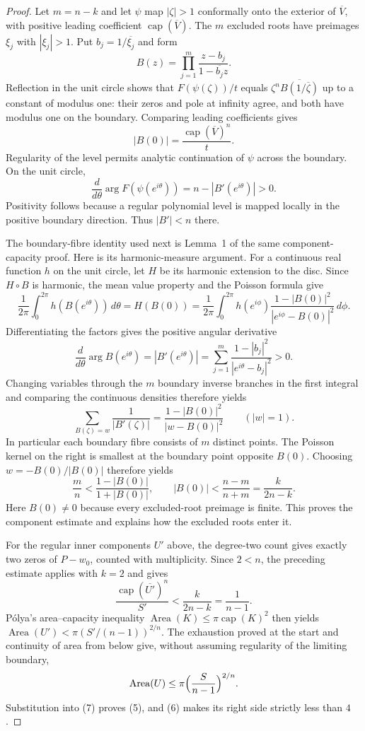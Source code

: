 \documentclass[11pt]{article}
\begin{document}
\begin{proof}
Let $m=n-k$ and let $\psi$ map $|\zeta|>1$ conformally onto the
exterior of $\overline V$, with positive leading coefficient
$\operatorname{cap}(\overline V)$. The $m$ excluded roots have preimages
$\xi_j$ with $|\xi_j|>1$. Put $b_j=1/\overline{\xi_j}$ and form
\[
 B(z)=\prod_{j=1}^m\frac{z-b_j}{1-\overline{b_j}z}.
\]
Reflection in the unit circle shows that $F(\psi(\zeta))/t$ equals
$\zeta^n\overline{B(1/\overline\zeta)}$ up to a constant of modulus one:
their zeros and pole at infinity agree, and both have modulus one on
the boundary. Comparing leading coefficients gives
\[
 |B(0)|=\frac{\operatorname{cap}(\overline V)^n}{t}.
\]
Regularity of the level permits analytic continuation of $\psi$ across
the boundary. On the unit circle,
\[
 \frac{d}{d\theta}\arg F(\psi(e^{i\theta}))
 =n-|B'(e^{i\theta})|>0.
\]
Positivity follows because a regular polynomial level is mapped locally
in the positive boundary direction. Thus $|B'|<n$ there.

The boundary-fibre identity used next is Lemma~1 of the same
component-capacity proof. Here is its harmonic-measure argument.
For a continuous real function $h$ on the unit circle, let $H$ be its
harmonic extension to the disc. Since $H\circ B$ is harmonic, the mean
value property and the Poisson formula give
\[
 \frac1{2\pi}\int_0^{2\pi}h(B(e^{i\theta}))\,d\theta
 =H(B(0))
 =\frac1{2\pi}\int_0^{2\pi}h(e^{i\phi})
   \frac{1-|B(0)|^2}{|e^{i\phi}-B(0)|^2}\,d\phi.
\]
Differentiating the factors gives the positive angular derivative
\[
 \frac{d}{d\theta}\arg B(e^{i\theta})
 =|B'(e^{i\theta})|
 =\sum_{j=1}^m\frac{1-|b_j|^2}{|e^{i\theta}-b_j|^2}>0.
\]
Changing variables through the $m$ boundary inverse branches in the
first integral and comparing the continuous densities therefore yields
\[
 \sum_{B(\zeta)=w}\frac1{|B'(\zeta)|}
 =\frac{1-|B(0)|^2}{|w-B(0)|^2}\qquad(|w|=1).
\]
In particular each boundary fibre consists of $m$ distinct points.
The Poisson kernel on the right is smallest at the boundary point
opposite $B(0)$. Choosing $w=-B(0)/|B(0)|$ therefore yields
\[
 \frac mn<\frac{1-|B(0)|}{1+|B(0)|},
 \qquad |B(0)|<\frac{n-m}{n+m}=\frac{k}{2n-k}.
\]
Here $B(0)\ne0$ because every excluded-root preimage is finite. This proves
the component estimate and explains how the excluded roots enter it.

For the regular inner components $U'$ above, the degree-two count gives
exactly two zeros of $P-w_0$, counted with multiplicity. Since $2<n$,
the preceding estimate applies with $k=2$ and gives
\[
 \frac{\operatorname{cap}(\overline{U'})^n}{S'}
 <\frac{k}{2n-k}=\frac1{n-1}.
\]
P\'olya's area--capacity inequality
$\operatorname{Area}(K)\le\pi\operatorname{cap}(K)^2$ \cite[Theorem~6]{crane}
then yields
$\operatorname{Area}(U')<\pi(S'/(n-1))^{2/n}$. The exhaustion proved
at the start and continuity of area from below give, without assuming
regularity of the limiting boundary,
\[
 \operatorname{Area}(U)\le\pi\Bigl(\frac{S}{n-1}\Bigr)^{2/n}.
\]
Substitution into (7) proves (5), and (6) makes its right side strictly less
than $4$.
\end{proof}
\end{document}
